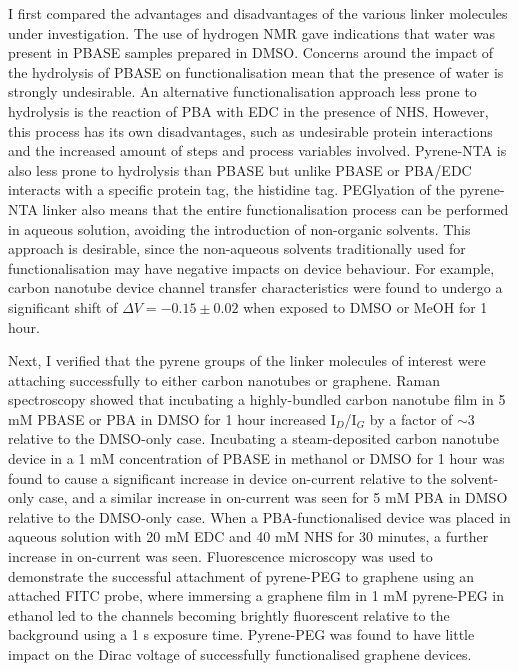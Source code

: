 \documentclass[
  a4paper,
]{scrbook}
\begin{document}
I first compared the advantages and disadvantages of the various linker
molecules under investigation. The use of hydrogen NMR gave indications
that water was present in PBASE samples prepared in DMSO. Concerns
around the impact of the hydrolysis of PBASE on functionalisation mean
that the presence of water is strongly undesirable. An alternative
functionalisation approach less prone to hydrolysis is the reaction of
PBA with EDC in the presence of NHS. However, this process has its own
disadvantages, such as undesirable protein interactions and the
increased amount of steps and process variables involved. Pyrene-NTA is
also less prone to hydrolysis than PBASE but unlike PBASE or PBA/EDC
interacts with a specific protein tag, the histidine tag. PEGlyation of
the pyrene-NTA linker also means that the entire functionalisation
process can be performed in aqueous solution, avoiding the introduction
of non-organic solvents. This approach is desirable, since the
non-aqueous solvents traditionally used for functionalisation may have
negative impacts on device behaviour. For example, carbon nanotube
device channel transfer characteristics were found to undergo a
significant shift of \(\Delta V = -0.15 \pm 0.02\) when exposed to DMSO
or MeOH for 1 hour.

Next, I verified that the pyrene groups of the linker molecules of
interest were attaching successfully to either carbon nanotubes or
graphene. Raman spectroscopy showed that incubating a highly-bundled
carbon nanotube film in 5 mM PBASE or PBA in DMSO for 1 hour increased
I\(_D\)/I\(_G\) by a factor of \(\sim 3\) relative to the DMSO-only
case. Incubating a steam-deposited carbon nanotube device in a 1 mM
concentration of PBASE in methanol or DMSO for 1 hour was found to cause
a significant increase in device on-current relative to the solvent-only
case, and a similar increase in on-current was seen for 5 mM PBA in DMSO
relative to the DMSO-only case. When a PBA-functionalised device was
placed in aqueous solution with 20 mM EDC and 40 mM NHS for 30 minutes,
a further increase in on-current was seen. Fluorescence microscopy was
used to demonstrate the successful attachment of pyrene-PEG to graphene
using an attached FITC probe, where immersing a graphene film in 1 mM
pyrene-PEG in ethanol led to the channels becoming brightly fluorescent
relative to the background using a 1 s exposure time. Pyrene-PEG was
found to have little impact on the Dirac voltage of successfully
functionalised graphene devices.
\end{document}
